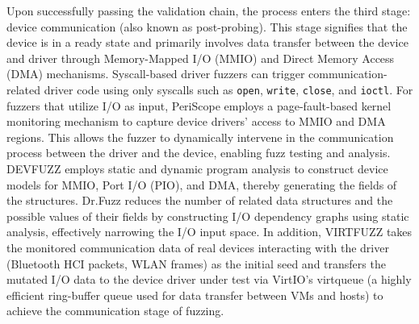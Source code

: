 Upon successfully passing the validation chain, the process enters the third stage: device communication (also known as post-probing). This stage signifies that the device is in a ready state and primarily involves data transfer between the device and driver through Memory-Mapped I/O (MMIO) and Direct Memory Access (DMA) mechanisms. Syscall-based driver fuzzers \cite{Syzkaller, 2017DIFUZE, Pustogarov2020ExvivoDA, maier2021bsod, zhao2022statefuzz, hao2023syzdescribe, Xu2024Saturn, Chen2024SyzGen++} can trigger communication-related driver code using only syscalls such as \texttt{open}, \texttt{write}, \texttt{close}, and \texttt{ioctl}. For fuzzers that utilize I/O as input, PeriScope \cite{Song2019PeriScopeAE} employs a page-fault-based kernel monitoring mechanism to capture device drivers' access to MMIO and DMA regions. This allows the fuzzer to dynamically intervene in the communication process between the driver and the device, enabling fuzz testing and analysis. DEVFUZZ \cite{wu2023devfuzz} employs static and dynamic program analysis to construct device models for MMIO, Port I/O (PIO), and DMA, thereby generating the fields of the structures. Dr.Fuzz \cite{zhao2022semantic} reduces the number of related data structures and the possible values of their fields by constructing I/O dependency graphs using static analysis, effectively narrowing the I/O input space. In addition, VIRTFUZZ \cite{Huster2024ToBoldly} takes the monitored communication data of real devices interacting with the driver (\eg Bluetooth HCI packets, WLAN frames) as the initial seed and transfers the mutated I/O data to the device driver under test via VirtIO's virtqueue (a highly efficient ring-buffer queue used for data transfer between VMs and hosts) to achieve the communication stage of fuzzing.


